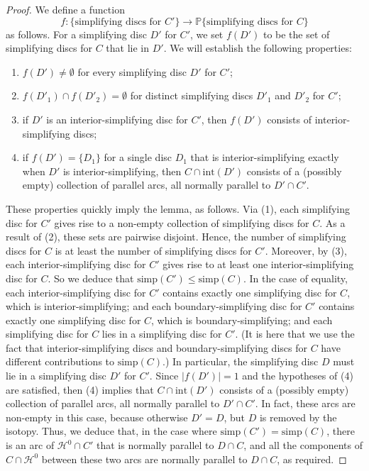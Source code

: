 \documentclass[oneside]{amsart}
\numberwithin{equation}{section}
\theoremstyle{plain}
\theoremstyle{definition}
\newcommand{\calH}{\mathcal{H}}
\begin{document}
\begin{proof}
We define a function
$$f \colon \{ \text{simplifying discs for } C' \} \rightarrow \mathbb{P} \{ \text{simplifying discs for } C \}$$
as follows. For a simplifying disc $D'$ for $C'$, we set $f(D')$ to be the set of simplifying discs for $C$ that lie in $D'$. We will establish the following properties:
\begin{enumerate}
\item $f(D') \not= \emptyset$ for every simplifying disc $D'$ for $C'$;
\item $f(D'_1) \cap f(D'_2) = \emptyset$ for distinct simplifying discs $D'_1$ and $D'_2$ for $C'$;
\item if $D'$ is an interior-simplifying disc for $C'$, then $f(D')$ consists of interior-simplifying discs;
\item if $f(D') = \{ D_1 \}$ for a single disc $D_1$ that is interior-simplifying exactly when $D'$ is interior-simplifying, then $C\cap \mathrm{int}(D')$ consists of a (possibly empty) collection of parallel arcs, all normally parallel to $D' \cap C'$.
\end{enumerate}
These properties quickly imply the lemma, as follows. Via (1), each simplifying disc for $C'$ gives rise to a non-empty collection of simplifying discs for $C$. As a result of (2), these sets are pairwise disjoint. Hence, the number of simplifying discs for $C$ is at least the number of simplifying discs for $C'$. Moreover, by (3), each interior-simplifying disc for $C'$ gives rise to at least one interior-simplifying disc for $C$. So we deduce that $\mathrm{simp}(C') \leq  \mathrm{simp}(C)$. In the case of equality, each interior-simplifying disc for $C'$ contains exactly one simplifying disc for $C$, which is interior-simplifying; and each boundary-simplifying disc for $C'$ contains exactly one simplifying disc for $C$, which is boundary-simplifying; and each simplifying disc for $C$ lies in a simplifying disc for $C'$. (It is here that we use the fact that interior-simplifying discs and boundary-simplifying discs for $C$ have different contributions to $\mathrm{simp}(C)$.) In particular, the simplifying disc $D$ must lie in a simplifying disc $D'$ for $C'$. Since $|f(D')| = 1$ and the hypotheses of (4) are satisfied, then (4) implies that $C\cap \mathrm{int}(D')$ consists of a (possibly empty) collection of parallel arcs, all normally parallel to $D' \cap C'$. In fact, these arcs are non-empty in this case, because otherwise $D' = D$, but $D$ is removed by the isotopy. Thus, we deduce that, in the case where $\mathrm{simp}(C') = \mathrm{simp}(C)$, there is an arc of $\calH^0 \cap C'$ that is normally parallel to $D \cap C$, and all the components of $C \cap \calH^0$ between these two arcs are normally parallel to $D \cap C$, as required.


\end{proof}
\end{document}

